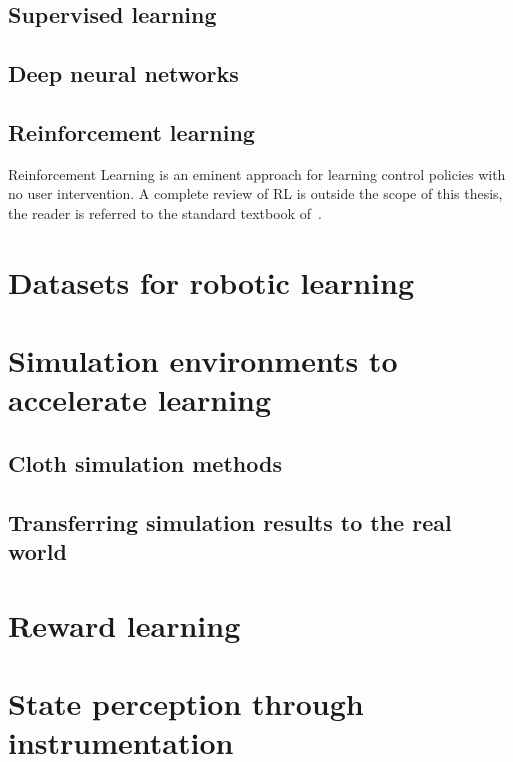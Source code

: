 \documentclass[\home/main.tex]{subfiles}
\begin{document}
\subsection{Supervised learning} \label{subsec:lit_sl}
\subsection{Deep neural networks} \label{subsec:lit_dnn}
\subsection{Reinforcement learning} \label{subsec:lit_rl}

Reinforcement Learning is an eminent approach for learning control policies with no user intervention. A complete review of RL is outside the scope of this thesis, the reader is referred to the standard textbook of~\citeauthor{SuttonAndBarto}. 

\section{Datasets for robotic learning} \label{sec:lit_datasets}
\section{Simulation environments to accelerate learning} \label{sec:lit_simulation}
\subsection{Cloth simulation methods} \label{subsec:lit_cloth_sim}
\subsection{Transferring simulation results to the real world}  \label{sec:lit_sim2real}
\section{Reward learning}  \label{sec:lit_reward_learning}
\section{State perception through instrumentation} \label{sec:lit_instrumentation}
\end{document}
